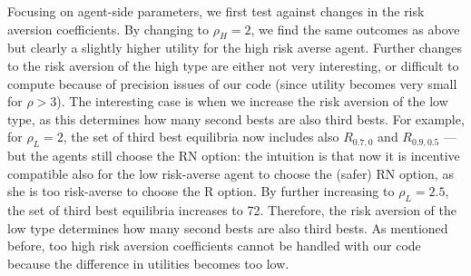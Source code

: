 Focusing on agent-side parameters, we first test against changes in the risk aversion coefficients. By changing to $\rho_H = 2$, we find the same outcomes as above but clearly a slightly higher utility for the high risk averse agent. Further changes to the risk aversion of the high type are either not very interesting, or difficult to compute because of precision issues of our code (since utility becomes very small for $\rho > 3$). The interesting case is when we increase the risk aversion of the low type, as this determines how many second bests are also third bests. For example, for $\rho_L=2$, the set of third best equilibria now includes also $R_{0.7,0}$ and $R_{0.9,0.5}$ --- but the agents still choose the RN option: the intuition is that now it is incentive compatible also for the low risk-averse agent to choose the (safer) RN option, as she is too risk-averse to choose the R option. By further increasing to $\rho_L=2.5$, the set of third best equilibria increases to 72. Therefore, the risk aversion of the low type determines how many second bests are also third bests. As mentioned before, too high risk aversion coefficients cannot be handled with our code because the difference in utilities becomes too low.
